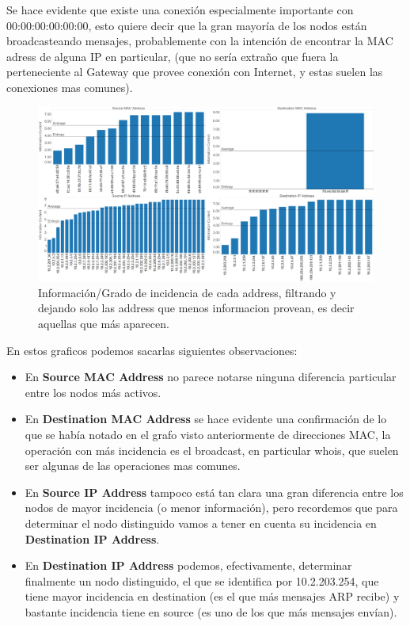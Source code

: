 \documentclass{article}
\theoremstyle{definition}
\theoremstyle{remark}
\begin{document}
Se hace evidente que existe una conexión especialmente importante con 00:00:00:00:00:00, esto quiere decir que la gran mayoría de los nodos están broadcasteando mensajes, probablemente con la intención de encontrar la MAC adress de alguna IP en particular, (que no sería extraño que fuera la perteneciente al Gateway que provee conexión con Internet, y estas suelen las conexiones mas comunes).

\begin{figure}[H]
\centering
\includegraphics[width=450pt]{captures/LabosDC/PDFs Dashboard.png}
\caption{Información/Grado de incidencia de cada address, filtrando y dejando solo las address que menos informacion provean, es decir aquellas que más aparecen.}
\end{figure}

En estos graficos podemos sacarlas siguientes observaciones:

\begin{itemize}
 
\item En \textbf{Source MAC Address} no parece notarse ninguna diferencia particular entre los nodos más activos.

\item En \textbf{Destination MAC Address} se hace evidente una confirmación de lo que se había notado en el grafo visto anteriormente de direcciones MAC, la operación con más incidencia es el broadcast, en particular whois, que suelen ser algunas de las operaciones mas comunes.

\item En \textbf{Source IP Address} tampoco está tan clara una gran diferencia entre los nodos de mayor incidencia (o menor información), pero recordemos que para determinar el nodo distinguido vamos a tener en cuenta su incidencia en \textbf{Destination IP Address}.

\item En \textbf{Destination IP Address} podemos, efectivamente, determinar finalmente un nodo distinguido, el que se identifica por 10.2.203.254, que tiene mayor incidencia en destination (es el que más mensajes ARP recibe) y bastante incidencia tiene en source (es uno de los que más mensajes envían). 

\end{itemize}
\end{document}

